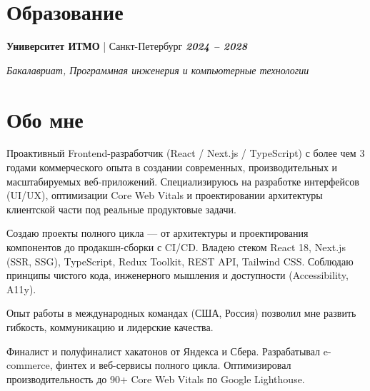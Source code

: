 \documentclass[a4paper,11pt]{article}
\newcommand{\entry}[3]{%
  \noindent\textbf{#1} | #2 \hfill \textbf{\textit{#3}} \par
}
\begin{document}
\section*{Образование}
\entry{Университет ИТМО}{Санкт-Петербург}{2024 – 2028}
\textit{Бакалавриат, Программная инженерия и компьютерные технологии}

\section{Обо мне}
Проактивный Frontend-разработчик (React / Next.js / TypeScript) с более чем 3 годами коммерческого опыта в создании современных, производительных и масштабируемых веб-приложений.  
Специализируюсь на разработке интерфейсов (UI/UX), оптимизации Core Web Vitals и проектировании архитектуры клиентской части под реальные продуктовые задачи.  

Создаю проекты полного цикла — от архитектуры и проектирования компонентов до продакшн-сборки с CI/CD.  
Владею стеком React 18, Next.js (SSR, SSG), TypeScript, Redux Toolkit, REST API, Tailwind CSS. Соблюдаю принципы чистого кода, инженерного мышления и доступности (Accessibility, A11y).  

Опыт работы в международных командах (США, Россия) позволил мне развить гибкость, коммуникацию и лидерские качества.  

Финалист и полуфиналист хакатонов от Яндекса и Сбера.  
Разрабатывал e-commerce, финтех и веб-сервисы полного цикла.  
Оптимизировал производительность до 90+ Core Web Vitals по Google Lighthouse.  
\end{document}
